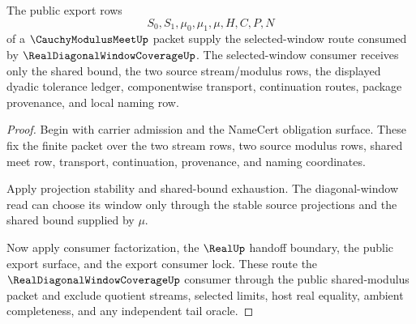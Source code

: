 \begin{theorem}
\label{thm:cauchy-modulus-meet-diagonal-window-consumer-handoff}
The public export rows
$$
S_0,S_1,\mu_0,\mu_1,\mu,H,C,P,N
$$
of a $\CauchyModulusMeetUp$ packet supply the selected-window route consumed by $\RealDiagonalWindowCoverageUp$. The selected-window consumer receives only the shared bound, the two source stream/modulus rows, the displayed dyadic tolerance ledger, componentwise transport, continuation routes, package provenance, and local naming row.
\end{theorem}
\begin{proof}
Begin with carrier admission and the NameCert obligation surface. These fix the finite packet over the two stream rows, two source modulus rows, shared meet row, transport, continuation, provenance, and naming coordinates.

Apply projection stability and shared-bound exhaustion. The diagonal-window read can choose its window only through the stable source projections and the shared bound supplied by $\mu$.

Now apply consumer factorization, the $\RealUp$ handoff boundary, the public export surface, and the export consumer lock. These route the $\RealDiagonalWindowCoverageUp$ consumer through the public shared-modulus packet and exclude quotient streams, selected limits, host real equality, ambient completeness, and any independent tail oracle.
\end{proof}

